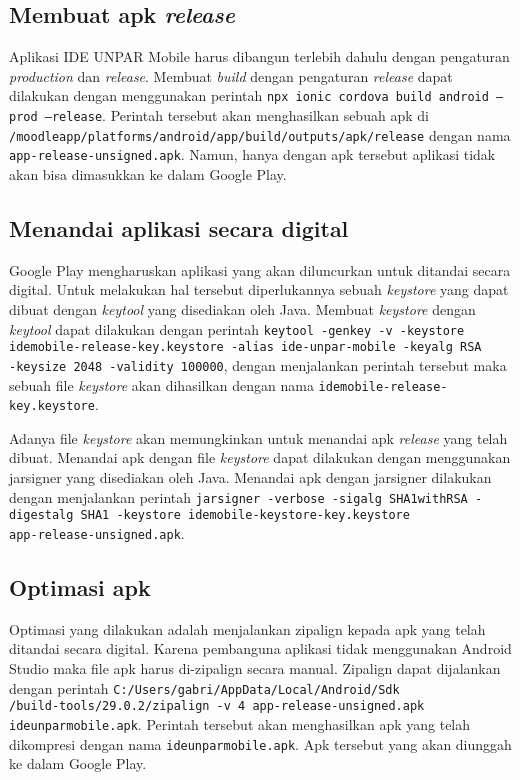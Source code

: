 \subsection{Membuat apk \textit{release}}

Aplikasi IDE UNPAR Mobile harus dibangun terlebih dahulu dengan pengaturan \textit{production} dan \textit{release}. Membuat \textit{build} dengan pengaturan \textit{release} dapat dilakukan dengan menggunakan perintah \texttt{npx ionic cordova build android --prod --release}. Perintah tersebut akan menghasilkan sebuah apk di \texttt{/moodleapp/platforms/android/app/build/outputs/apk/release} dengan nama \texttt{app-release-unsigned.apk}. Namun, hanya dengan apk tersebut aplikasi tidak akan bisa dimasukkan ke dalam Google Play.

\subsection{Menandai aplikasi secara digital}
Google Play mengharuskan aplikasi yang akan diluncurkan untuk ditandai secara digital. Untuk melakukan hal tersebut diperlukannya sebuah \textit{keystore} yang dapat dibuat dengan \textit{keytool} yang disediakan oleh Java. Membuat \textit{keystore} dengan \textit{keytool} dapat dilakukan dengan perintah \texttt{keytool -genkey -v -keystore idemobile-release-key.keystore -alias ide-unpar-mobile -keyalg RSA \\ -keysize 2048 -validity 100000}, dengan menjalankan perintah tersebut maka sebuah file \textit{keystore} akan dihasilkan dengan nama \texttt{idemobile-release-key.keystore}.

Adanya file \textit{keystore} akan memungkinkan untuk menandai apk \textit{release} yang telah dibuat. Menandai apk dengan file \textit{keystore} dapat dilakukan dengan menggunakan jarsigner yang disediakan oleh Java. Menandai apk dengan jarsigner dilakukan dengan menjalankan perintah \texttt{jarsigner -verbose -sigalg SHA1withRSA -digestalg SHA1 -keystore idemobile-keystore-key.keystore \\ app-release-unsigned.apk}. 

\subsection{Optimasi apk}
Optimasi yang dilakukan adalah menjalankan zipalign kepada apk yang telah ditandai secara digital. Karena pembanguna aplikasi tidak menggunakan Android Studio maka file apk harus di-zipalign secara manual. Zipalign dapat dijalankan dengan perintah \texttt{C:/Users/gabri/AppData/Local/Android/Sdk\\/build-tools/29.0.2/zipalign -v 4 app-release-unsigned.apk ideunparmobile.apk}. Perintah tersebut akan menghasilkan apk yang telah dikompresi dengan nama \texttt{ideunparmobile.apk}. Apk tersebut yang akan diunggah ke dalam Google Play.



